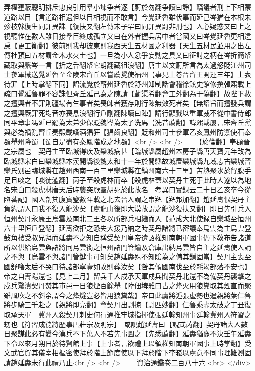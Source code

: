 弄權壅蔽聰明排斥忠良引用羣小諫争者逐【蔚於勿翻争讀曰諍】竊議者刑上下相蒙道路以目【言道路相遇但以目相視而不敢言】今覺延魯雖伏辜而延己岑猶在本根未殄枝榦復生同罪異誅【復扶又翻左傳宋子罕曰同罪異罸非刑也】人心疑惑又曰上之視聽惟在數人雖日接羣臣終成孤立又曰在外者握兵居中者當國又曰岑覺延魯更相違戾【更工衡翻】彼前則我却彼東則我西天生五材國之利器【天生五材民並用之出左傳杜預曰五材謂金木水火土也】一旦為小人忿爭妄動之具又曰征討之柄在岑折簡帑藏取與繫岑一言【折之舌翻帑它朗翻藏徂浪翻】唐主以文蔚所言為太過怒貶江州司士參軍械送覺延魯至金陵宋齊丘以嘗薦覺使福州【事見上卷晉齊王開運三年】上表待罪【上時掌翻下同】詔流覺於蘄州延魯於舒州知制誥會稽徐鉉史館修撰韓熙載上疏曰覺延魯罪不容誅但齊丘延己為之陳請【蘄渠希翻會工外翻為于偽翻】故陛下赦之擅興者不罪則疆場有生事者矣喪師者獲存則行陳無效死者矣【無詔旨而擅發兵謂之擅興厥罪死場音亦喪息浪翻行戶剛翻陳讀曰陣】請行顯戮以重軍威不從中書侍郎同平章事馮延已罷為太弟少保貶魏岑為太子洗馬【洗昔薦翻】韓熙載屢言宋齊丘黨與必為禍亂齊丘奏熙載嗜酒猖狂【猖齒良翻】貶和州司士參軍乙亥鳳州防禦使石奉頵舉州降蜀【蜀自是盡有秦鳳階成之地頵】<br />
<br />
　　【於倫翻】奉頵晉之宗屬也　契丹主至臨城得疾及欒城病甚【臨城縣屬趙州本房子縣唐天寶元年改為臨城縣宋白曰欒城縣本漢開縣後魏太和十一年於開縣故城置欒城縣九域志古欒城晉欒氏别邑臨城縣在趙州西南一百三里欒城縣在鎮州南六十三里】苦熱聚氷於胷腹手足且啖之【啖徒濫翻】丙子至殺虎林而卒【殺虎林蓋以契丹主死于此時人遂以為地名宋白曰殺虎林唐天后時襲突厥羣胡死於此故名　考異曰實録云二十日乙亥卒今從陷蕃記】國人剖其腹實鹽數斗載之北去晉人謂之帝羓【羓邦加翻】趙延夀恨契丹主負約謂人曰我不復入龍沙矣【盧龍山後即大漠故謂之龍沙復扶又翻】即日先引兵入恒州契丹永康王烏雲及南北二王各以所部兵相繼而入【范成大北使録自欒城至恒州六十里恒戶登翻】延夀欲拒之恐失大援乃納之時契丹諸將已密議奉烏雲為主烏雲登鼔角樓受叔兄拜而延夀不之知自稱受契丹皇帝遺詔權知南朝軍國事仍下敎布告諸道所以供給烏雲與諸將同烏雲銜之恒州諸門管鑰及倉庫出納烏雲皆自主之延夀使人請之不與【烏雲不與諸門管鍵事可知矣趙延夀殊不知隂為之備其鎖固當】契丹主喪至國舒嚕太后不哭曰待諸部寧壹如故則葬汝矣【咎其傾國南伐至於耗竭部落不安也】　帝之自夀陽還也【見上二月】留兵千人戍承天軍戍兵聞契丹北還不為備契丹襲擊之戍兵驚潰契丹焚其市邑一日狼煙百餘舉【陸佃埤雅曰古之烽火用狼糞取其煙直而聚雖風吹之不斜余謂今之烽燧豈必皆用狼糞哉】帝曰此虜將遁張虚勢也遣親將葉仁魯將步騎三千赴之【親將即亮翻】會契丹出剽掠【剽匹妙翻】仁魯乘虚太破之丁丑復取承天軍　冀州人殺契丹刺史何行通推牢城指揮使張廷翰知州事廷翰冀州人符習之甥也【符習成德將歷事唐莊宗及明宗】　或說趙延夀曰【說式芮翻】契丹諸大人數日聚謀此必有變今漢兵不下萬人不若先事圖之【先悉薦翻】延夀猶豫不決壬午延夀下令以來月朔日於待賢館上事【上事者言欲禮上以領權知南朝軍國事上時掌翻】受文武官賀其儀宰相樞密使拜於階上節度使以下拜於階下李崧以虜意不同事理難測固請趙延夀未行此禮乃止<br />
<br />
　　資治通鑑卷二百八十六  <br>
   </div> 

